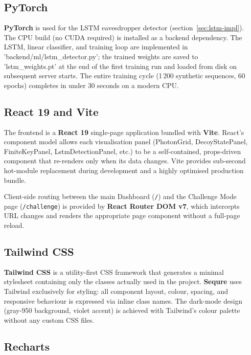 \documentclass[12pt, a4paper]{article}
\begin{document}
\subsection{PyTorch}
\label{sec:pytorch}

\textbf{PyTorch} is used for the LSTM eavesdropper detector
(section~\ref{sec:lstm-impl}). The CPU build (no CUDA required) is
installed as a backend dependency. The LSTM, linear classifier, and
training loop are implemented in 'backend/ml/lstm\_detector.py';
the trained weights are saved to 'lstm\_weights.pt' at the end
of the first training run and loaded from disk on subsequent server
starts. The entire training cycle (1\,200 synthetic sequences, 60 epochs)
completes in under 30 seconds on a modern CPU.

\subsection{React 19 and Vite}
\label{sec:react}

The frontend is a \textbf{React 19} single-page application bundled with
\textbf{Vite}. React's component model allows each visualisation panel
(PhotonGrid, DecoyStatePanel, FiniteKeyPanel, LstmDetectionPanel, etc.)
to be a self-contained, props-driven component that re-renders only when
its data changes. Vite provides sub-second hot-module replacement during
development and a highly optimised production bundle.

Client-side routing between the main Dashboard (\texttt{/}) and the
Challenge Mode page (\texttt{/challenge}) is provided by
\textbf{React Router DOM v7}, which intercepts URL changes and renders the
appropriate page component without a full-page reload.

\subsection{Tailwind CSS}
\label{sec:tailwind}

\textbf{Tailwind CSS} is a utility-first CSS framework that generates
a minimal stylesheet containing only the classes actually used in the
project. \textbf{Sequre} uses Tailwind exclusively for styling: all component
layout, colour, spacing, and responsive behaviour is expressed via
inline class names. The dark-mode design (gray-950 background, violet
accent) is achieved with Tailwind's colour palette without any custom
CSS files.

\subsection{Recharts}
\label{sec:recharts}
\end{document}
